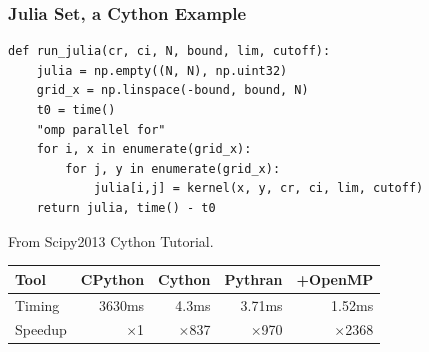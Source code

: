\documentclass[aspectratio=1610]{beamer}
\begin{document}
\begin{frame}[fragile]
    \frametitle{Julia Set, a Cython Example}

\begin{lstlisting}
def run_julia(cr, ci, N, bound, lim, cutoff):
    julia = np.empty((N, N), np.uint32)
    grid_x = np.linspace(-bound, bound, N)
    t0 = time()
    "omp parallel for"
    for i, x in enumerate(grid_x):
        for j, y in enumerate(grid_x):
            julia[i,j] = kernel(x, y, cr, ci, lim, cutoff)
    return julia, time() - t0
\end{lstlisting}
From Scipy2013 Cython Tutorial.
\vfill
    \begin{tabular}{|l|r|r|r|r|}
        \hline
        Tool    &  CPython    &  Cython  &  Pythran & +OpenMP   \\
        \hline
        Timing  &  3630ms    &   4.3ms  &   3.71ms  & 1.52ms  \\
        \hline
        Speedup & $\times$1 &  $\times$837 &  $\times$970 & $\times$2368   \\
        \hline
    \end{tabular}

\end{frame}
\end{document}
